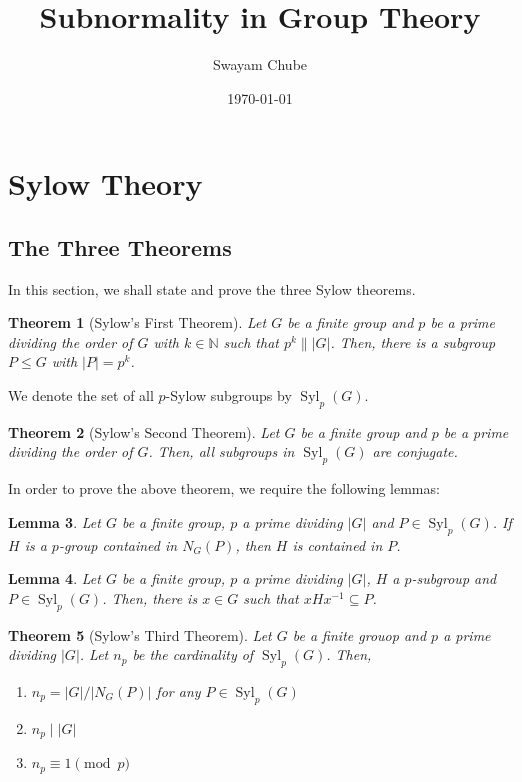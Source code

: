 \documentclass[12pt]{article}
\title{Subnormality in Group Theory}
\author{Swayam Chube}
\date{\today}
\theoremstyle{thmstyle}
\newtheorem{theorem}{Theorem}[section]
\newtheorem{lemma}[theorem]{Lemma}
\theoremstyle{defstyle}
\newcommand{\N}{\mathbb{N}}
\renewcommand{\le}{\leqslant}
\newcommand{\Syl}{\operatorname{Syl}}
\begin{document}
\maketitle

\section{Sylow Theory}

\subsection{The Three Theorems}

In this section, we shall state and prove the three Sylow theorems.

\begin{theorem}[Sylow's First Theorem]
    Let $G$ be a finite group and $p$ be a prime dividing the order of $G$ with $k\in\N$ such that $p^k\||G|$. Then, there is a subgroup $P\le G$ with $|P| = p^k$.
\end{theorem}

We denote the set of all $p$-Sylow subgroups by $\Syl_p(G)$.

\begin{theorem}[Sylow's Second Theorem]
    Let $G$ be a finite group and $p$ be a prime dividing the order of $G$. Then, all subgroups in $\Syl_p(G)$ are conjugate.
\end{theorem}

In order to prove the above theorem, we require the following lemmas: 
\begin{lemma}
    Let $G$ be a finite group, $p$ a prime dividing $|G|$ and $P\in\Syl_p(G)$. If $H$ is a $p$-group contained in $N_G(P)$, then $H$ is contained in $P$.
\end{lemma}

\begin{lemma}
    Let $G$ be a finite group, $p$ a prime dividing $|G|$, $H$ a $p$-subgroup and $P\in\Syl_p(G)$. Then, there is $x\in G$ such that $xHx^{-1}\subseteq P$.
\end{lemma}

\begin{theorem}[Sylow's Third Theorem]
    Let $G$ be a finite grouop and $p$ a prime dividing $|G|$. Let $n_p$ be the cardinality of $\Syl_p(G)$. Then, 
    \begin{enumerate}
        \item $n_p = |G|/|N_G(P)|$ for any $P\in\Syl_p(G)$
        \item $n_p\mid |G|$
        \item $n_p\equiv1\pmod p$
    \end{enumerate}
\end{theorem}
\end{document}
